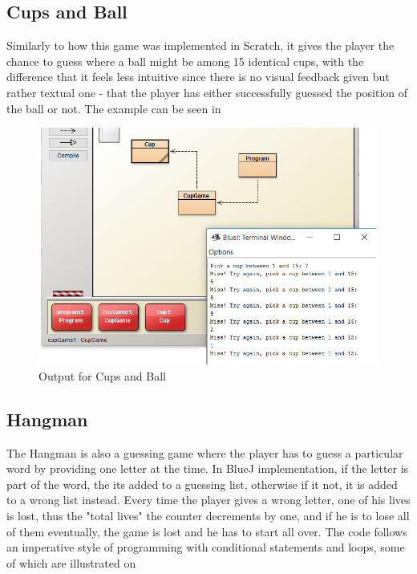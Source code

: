 \subsection{Cups and Ball}
Similarly to how this game was implemented in Scratch, it gives the player the chance to guess where a ball might be among 15 identical cups, with the difference that it feels less intuitive since there is no visual feedback given but rather textual one - that the player has either successfully guessed the position of the ball or not. The example can be seen in  

\begin{figure}[!h]
  \centering
      \includegraphics[scale=0.7]{./pics/bluej_ballcup_code}
      \caption{Output for Cups and Ball}
      \label{fig:bluej_ballcup_code} 
\end{figure}

\subsection{Hangman}
The Hangman is also a guessing game where the player has to guess a particular word by providing one letter at the time. In BlueJ implementation, if the letter is part of the word, the its added to a guessing list, otherwise if it not, it is added to a wrong list instead. Every time the player gives a wrong letter, one of his lives is lost, thus the "total lives" the counter decrements by one, and if he is to lose all of them eventually, the game is lost and he has to start all over. The code follows an imperative style of programming with conditional statements and loops, some of which are illustrated on  

